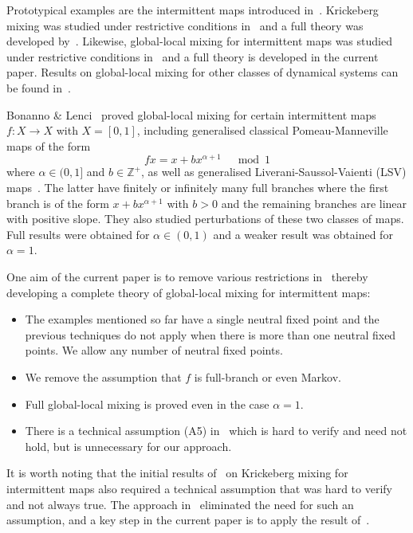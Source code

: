 \documentclass[12pt]{article}
\numberwithin{equation}{section}
\newcommand{\Z}{{\mathbb Z}}
\begin{document}
Prototypical examples are the intermittent maps introduced in~\cite{PomeauManneville80}. Krickeberg mixing was studied under restrictive conditions in~\cite{Thaler00} and a full theory was developed by~\cite{Gouezel11,MT12,Terhesiu15,Terhesiu16}.
Likewise, global-local mixing for intermittent maps was studied under restrictive conditions in~\cite{BonannoGiuliettiLenci18,BonannoLenci21,CanestrariLenci_arxiv} and a full theory is developed in the current paper. Results on global-local mixing for other classes of dynamical systems can be found in~\cite{BonannoGiuliettiLenci18b,DolgopyatNandori22,GiuliettiHammerlindlRavotti22}.

Bonanno \& Lenci~\cite{BonannoLenci21} proved global-local mixing for certain intermittent maps $f:X\to X$ with $X=[0,1]$, including generalised classical Pomeau-Manneville maps of the form
\[
fx=x+b x^{\alpha+1}\quad\bmod 1
\]
where $\alpha\in(0,1]$ and $b\in\Z^+$, as well as generalised Liverani-Saussol-Vaienti (LSV) maps~\cite{LSV99}. The latter have finitely or infinitely many full branches where the first branch is of the form $x+b x^{\alpha+1}$ with $b>0$ and the remaining branches are linear with positive slope. They also studied perturbations of these two classes of maps. Full results were obtained for $\alpha\in(0,1)$ and a weaker result was obtained for $\alpha=1$.

One aim of the current paper is to remove various restrictions in~\cite{BonannoLenci21} thereby developing a complete theory of global-local mixing for intermittent maps:
\begin{itemize}

\parskip=-1pt
\item The examples mentioned so far have a single neutral fixed point and the previous techniques do not apply when there is more than one neutral fixed points. We allow any number of neutral fixed points. 
\item We remove the assumption that $f$ is full-branch or even Markov.
\item Full global-local mixing is proved even in the case $\alpha=1$.
\item There is a technical assumption (A5) in~\cite{BonannoLenci21} which is hard to verify and need not hold, but is unnecessary for our approach.
\end{itemize}

It is worth noting that the initial results of~\cite{Thaler00} on Krickeberg mixing for intermittent maps also required a technical assumption that was hard to verify and not always true. The approach in~\cite{MT12} eliminated the need for such an assumption, and a key step in the current paper is to apply the result of~\cite{MT12}.
\end{document}

